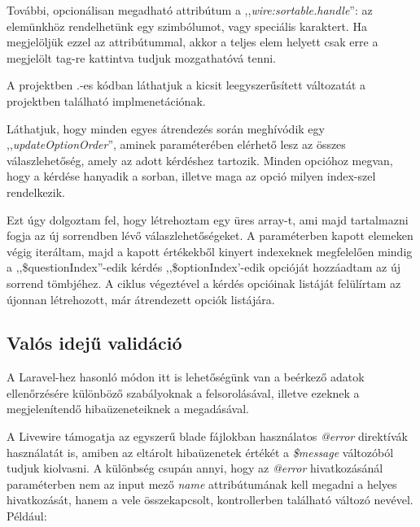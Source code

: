 \documentclass[
]{thesis-ekf}
\theoremstyle{definition}
\theoremstyle{remark}
\begin{document}
                További, opcionálisan megadható attribútum a ,,\emph{wire:sortable.handle}'': az elemünkhöz rendelhetünk egy szimbólumot, vagy speciális karaktert. Ha megjelöljük ezzel az attribútummal, akkor a teljes elem helyett csak erre a megjelölt tag-re kattintva tudjuk mozgathatóvá tenni.
                

                A projektben \az{\ref{SortableExample}}.-es kódban láthatjuk a kicsit leegyszerűsített változatát a projektben található implmenetációnak. 
                
                Láthatjuk, hogy minden egyes átrendezés során meghívódik egy ,,\emph{updateOptionOrder}'', aminek paraméterében elérhető lesz az összes válaszlehetőség, amely az adott kérdéshez tartozik. Minden opcióhoz megvan, hogy a kérdése hanyadik a sorban, illetve maga az opció milyen index-szel rendelkezik. 
                
                Ezt úgy dolgoztam fel, hogy létrehoztam egy üres array-t, ami majd tartalmazni fogja az új sorrendben lévő válaszlehetőségeket. A paraméterben kapott elemeken végig iteráltam, majd a kapott értékekből kinyert indexeknek megfelelően mindig a ,,\$questionIndex''-edik kérdés ,,\$optionIndex'-edik opcióját hozzáadtam az új sorrend tömbjéhez. A ciklus végeztével a kérdés opcióinak listáját felülírtam az újonnan létrehozott, már átrendezett opciók listájára.
                
                \subsection{Valós idejű validáció}\label{LivewireRealTimeValidation}
                A Laravel-hez hasonló módon itt is lehetőségünk van a beérkező adatok ellenőrzésére különböző szabályoknak a felsorolásával, illetve ezeknek a megjelenítendő hibaüzeneteiknek a megadásával.

                A Livewire támogatja az egyszerű blade fájlokban használatos \emph{@error} direktívák használatát is, amiben az eltárolt hibaüzenetek értékét a \emph{\$message} változóból tudjuk kiolvasni. A különbség csupán annyi, hogy az \emph{@error} hivatkozásánál paraméterben nem az input mező \emph{name} attribútumának kell megadni a helyes hivatkozását, hanem a vele összekapcsolt, kontrollerben található változó nevével. Például: 
                
                
\end{document}
